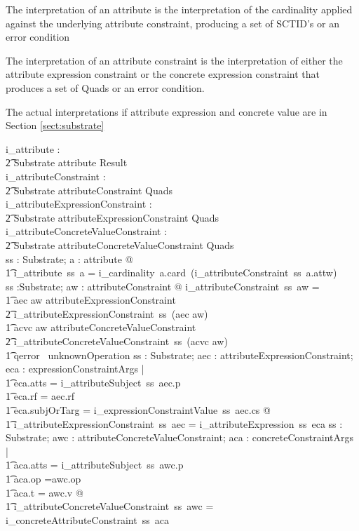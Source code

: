 \documentclass{article}
\begin{document}
The interpretation of an attribute is the interpretation of the cardinality applied against the
underlying attribute constraint, producing a set of SCTID's or an error condition

The interpretation of an attribute constraint is the interpretation of either the attribute expression
constraint or the concrete expression constraint that produces a set of Quads or an error condition.

The actual interpretations if attribute expression and concrete value are in Section \ref{sect:substrate}
\begin{gendef}
   i\_attribute : \\
\t2 Substrate \pfun attribute \pfun Result \\
   i\_attributeConstraint : \\
\t2 Substrate \pfun attributeConstraint \pfun Quads \\
   i\_attributeExpressionConstraint : \\
\t2 Substrate \pfun attributeExpressionConstraint \pfun Quads \\
   i\_attributeConcreteValueConstraint : \\
\t2 Substrate \pfun attributeConcreteValueConstraint \pfun Quads \\
\where
\forall ss : Substrate; a : attribute @ \\
\t1 i\_attribute~ss~a =  i\_cardinality~a.card~(i\_attributeConstraint~ss~a.attw) \\
\also
\forall ss :Substrate; aw : attributeConstraint @ i\_attributeConstraint~ss~aw = \\
\t1 \IF aec \inv aw \in attributeExpressionConstraint \\
\t2  \THEN i\_attributeExpressionConstraint~ss~(aec \inv aw) \\
\t1 \ELSE \IF acvc \inv aw \in attributeConcreteValueConstraint \\
\t2  \THEN i\_attributeConcreteValueConstraint~ss~(acvc \inv aw) \\
\t1 \ELSE qerror~ unknownOperation
 \also
\forall ss : Substrate; aec : attributeExpressionConstraint; eca : expressionConstraintArgs | \\
\t1 eca.atts = i\_attributeSubject~ss~aec.p \land \\
\t1 eca.rf = aec.rf \land \\
\t1 eca.subjOrTarg = i\_expressionConstraintValue~ss~aec.cs @ \\
\t1 i\_attributeExpressionConstraint~ss~aec = i\_attributeExpression~ss~eca
\also 
\forall ss : Substrate; awc : attributeConcreteValueConstraint; aca : concreteConstraintArgs | \\
\t1 aca.atts = i\_attributeSubject~ss~awc.p \land \\
\t1 aca.op =awc.op \land \\
\t1 aca.t = awc.v @ \\
\t1 i\_attributeConcreteValueConstraint~ss~awc = i\_concreteAttributeConstraint~ss~aca \\
\end{gendef}
\end{document}
